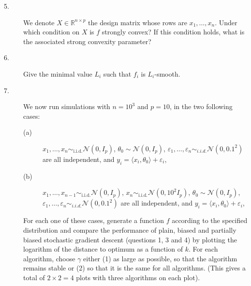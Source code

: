 \documentclass[11pt,reqno]{article}
\newcommand{\R}{\mathbb{R}}
\newcommand{\cN}{\mathcal{N}}
\numberwithin{equation}{section}
\theoremstyle{plain}
\theoremstyle{definition}
\theoremstyle{remark}
\begin{document}
\begin{description}
	\item[5.] We denote $X \in \R^{n \times p}$ the design matrix whose rows are $x_1, \dots, x_n$. Under which condition on $X$ is $f$ strongly convex? If this condition holds, what is the associated strong convexity parameter?
	\item[6.] Give the minimal value $L_i$ such that $f_i$ is $L_i$-smooth.  
	\item[7.] We now run simulations with $n = 10^3$ and $p = 10$, in the two following cases:
	\begin{description}
		\item[(a)] $x_1, \dots, x_n \sim_{\text{i.i.d.}} \cN(0, I_p)$, $\theta_0 \sim \cN(0,I_p)$, $\varepsilon_1, \dots, \varepsilon_n \sim_{i.i.d.} \cN(0,0.1^2)$ are all independent, and $y_i = \langle x_i, \theta_0 \rangle + \varepsilon_i$,
		\item[(b)] $x_1, \dots, x_{n-1} \sim_{\text{i.i.d.}} \cN(0, I_p)$, $x_{n} \sim_{\text{i.i.d.}} \cN(0, 10^2I_p)$, $\theta_0 \sim \cN(0,I_p)$, $\varepsilon_1, \dots, \varepsilon_n \sim_{i.i.d.} \cN(0,0.1^2)$ are all independent, and $y_i = \langle x_i, \theta_0 \rangle + \varepsilon_i$, 
	\end{description} 
	For each one of these cases, generate a function $f$ according to the specified distribution and compare the performance of plain, biased and partially biased stochastic gradient descent (questions 1, 3 and 4) by plotting the logarithm of the distance to optimum as a function of $k$. For each algorithm, choose $\gamma$ either (1) as large as possible, so that the algorithm remains stable or (2) so that it is the same for all algorithms. (This gives a total of $2 \times 2 = 4$ plots with three algorithms on each plot).
\end{description}
\end{document}
